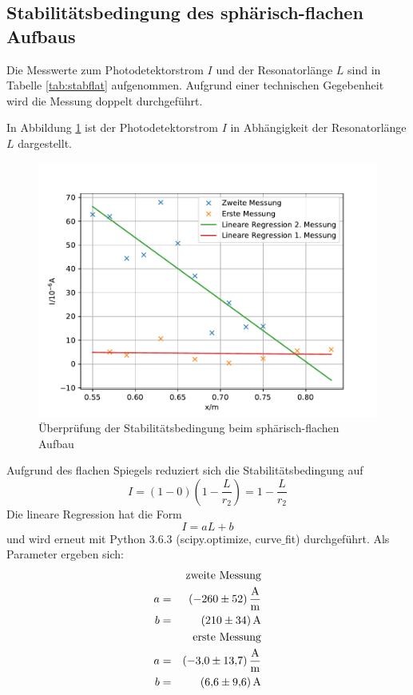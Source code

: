 \subsection{Stabilitätsbedingung des sphärisch-flachen Aufbaus}
Die Messwerte zum Photodetektorstrom $I$ und der Resonatorlänge $L$ sind in Tabelle \ref{tab:stabflat} aufgenommen.
Aufgrund einer technischen Gegebenheit wird die Messung doppelt durchgeführt.

In Abbildung \ref{fig:stabflat} ist der Photodetektorstrom $I$ in Abhängigkeit der Resonatorlänge $L$ dargestellt.
\begin{figure}
  \centering
  \includegraphics[width=\textwidth]{stabflat.pdf}
  \caption{Überprüfung der Stabilitätsbedingung beim sphärisch-flachen Aufbau}
  \label{fig:stabflat}
\end{figure}
Aufgrund des flachen Spiegels reduziert sich die Stabilitätsbedingung auf
\begin{equation*}
  I=\left(1-0 \right) \left(1- \frac{L}{r_2} \right)=1- \frac{L}{r_2}
\end{equation*}
Die lineare Regression hat die Form
\begin{equation*}
  I= aL+b
\end{equation*}
und wird erneut mit Python 3.6.3 (scipy.optimize, curve$\_$fit) durchgeführt.
Als Parameter ergeben sich:
\begin{align*}
&&\text{zweite Messung} \\
a &=& \SI{ -260 \pm 52 }{\frac{A}{m}} \\
b &=& \SI{  210 \pm 34 }{A} \\
&&\text{erste Messung} \\
a &=& \SI{ -3.0 \pm 13.7 }{\frac{A}{m}} \\
b &=& \SI{  6.6 \pm 9.6 }{A} \\
\end{align*}
